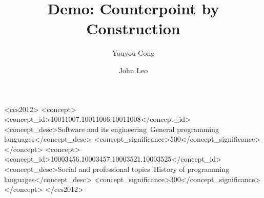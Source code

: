 \documentclass[sigplan,review]{acmart}\settopmatter{printfolios=true,printccs=false,printacmref=false}
\begin{document}
\title{Demo: Counterpoint by Construction}


\author{Youyou Cong}

\author{John Leo}




\begin{CCSXML}
<ccs2012>
<concept>
<concept_id>10011007.10011006.10011008</concept_id>
<concept_desc>Software and its engineering~General programming languages</concept_desc>
<concept_significance>500</concept_significance>
</concept>
<concept>
<concept_id>10003456.10003457.10003521.10003525</concept_id>
<concept_desc>Social and professional topics~History of programming languages</concept_desc>
<concept_significance>300</concept_significance>
</concept>
</ccs2012>
\end{CCSXML}




\maketitle
\end{document}
